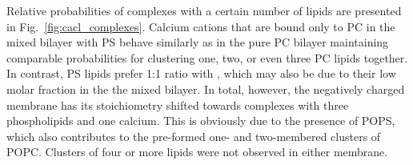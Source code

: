 \documentclass[journal=jpcbfk,manuscript=article]{achemso}
\begin{document}
Relative probabilities of  complexes with a certain number of lipids are presented in Fig.~\ref{fig:cacl_complexes}. 
Calcium cations that are bound only to PC in the mixed bilayer with PS 
behave similarly as in the pure PC bilayer
maintaining comparable probabilities for clustering one, two, or even three PC lipids together. 
In contrast, PS lipids prefer 1:1 ratio with ,
which may also be due to their low molar fraction in the the mixed bilayer. 
In total, however, the negatively charged membrane has its stoichiometry 
shifted towards complexes with three phospholipids and one calcium. 
This is obviously due to the presence of POPS, 
which also contributes to the pre-formed one- and two-membered clusters of POPC. 
Clusters of four or more lipids were not observed in either membrane. 










 
 
 





\end{document}
